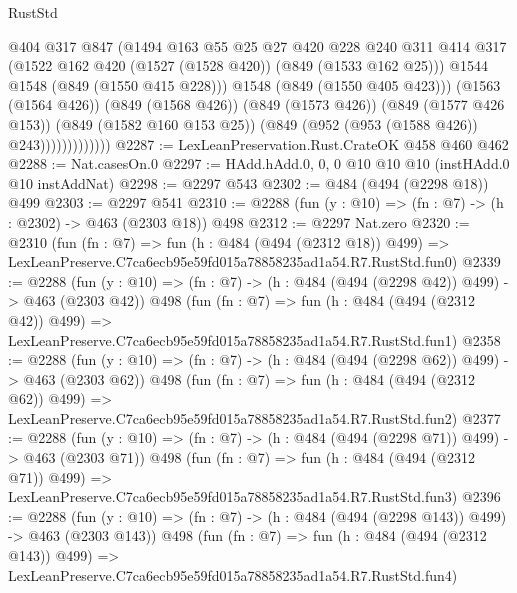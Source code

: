 \begin{lexlean}{RustStd}
\begin{coremodule}
                            @404
                            @317
                            @847
                            (@1494
                              @163
                              @55
                              @25
                              @27
                              @420
                              @228
                              @240
                              @311
                              @414
                              @317
                              (@1522 @162 @420 (@1527 (@1528 @420)) (@849 (@1533 @162 @25)))
                              @1544
                              @1548
                              (@849 (@1550 @415 @228)))
                            @1548
                            (@849 (@1550 @405 @423)))
                          (@1563 (@1564 @426))
                          (@849 (@1568 @426))
                          (@849 (@1573 @426))
                          (@849 (@1577 @426 @153))
                          (@849 (@1582 @160 @153 @25))
                          (@849 (@952 (@953 (@1588 @426)) @243)))))))))))))
@2287 := LexLeanPreservation.Rust.CrateOK @458 @460 @462
@2288 := Nat.casesOn.{0}
@2297 := HAdd.hAdd.{0, 0, 0} @10 @10 @10 (instHAdd.{0} @10 instAddNat)
@2298 := @2297 @543
@2302 := @484 (@494 (@2298 @18)) @499
@2303 := @2297 @541
@2310 := @2288 (fun (y : @10) => (fn : @7) -> (h : @2302) -> @463 (@2303 @18)) @498
@2312 := @2297 Nat.zero
@2320 := @2310
    (fun (fn : @7) =>
    fun (h : @484 (@494 (@2312 @18)) @499) =>
    LexLeanPreserve.C7ca6ecb95e59fd015a78858235ad1a54.R7.RustStd.fun0)
@2339 := @2288
    (fun (y : @10) => (fn : @7) -> (h : @484 (@494 (@2298 @42)) @499) -> @463 (@2303 @42))
    @498
    (fun (fn : @7) =>
    fun (h : @484 (@494 (@2312 @42)) @499) =>
    LexLeanPreserve.C7ca6ecb95e59fd015a78858235ad1a54.R7.RustStd.fun1)
@2358 := @2288
    (fun (y : @10) => (fn : @7) -> (h : @484 (@494 (@2298 @62)) @499) -> @463 (@2303 @62))
    @498
    (fun (fn : @7) =>
    fun (h : @484 (@494 (@2312 @62)) @499) =>
    LexLeanPreserve.C7ca6ecb95e59fd015a78858235ad1a54.R7.RustStd.fun2)
@2377 := @2288
    (fun (y : @10) => (fn : @7) -> (h : @484 (@494 (@2298 @71)) @499) -> @463 (@2303 @71))
    @498
    (fun (fn : @7) =>
    fun (h : @484 (@494 (@2312 @71)) @499) =>
    LexLeanPreserve.C7ca6ecb95e59fd015a78858235ad1a54.R7.RustStd.fun3)
@2396 := @2288
    (fun (y : @10) => (fn : @7) -> (h : @484 (@494 (@2298 @143)) @499) -> @463 (@2303 @143))
    @498
    (fun (fn : @7) =>
    fun (h : @484 (@494 (@2312 @143)) @499) =>
    LexLeanPreserve.C7ca6ecb95e59fd015a78858235ad1a54.R7.RustStd.fun4)

\end{coremodule}
\end{lexlean}
